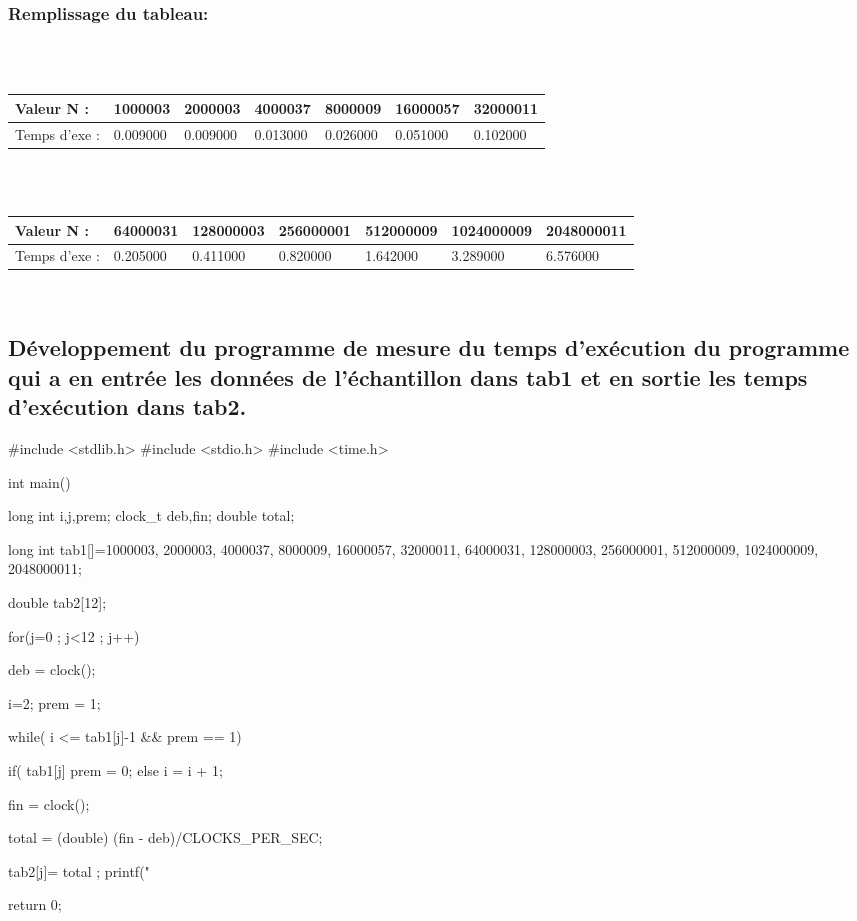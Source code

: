 \documentclass[12pt]{article}
\begin{document}
\subsubsection{Remplissage du tableau:}
\color{blue}
\textrm{  }
\\
\\
\begin{tabular}{|p{3cm}||p{1.8cm}|p{1.8cm}|p{1.8cm}|p{1.8cm}|p{1.8cm}|p{1.8cm}|}
\hline
Valeur N : & 1000003 & 2000003 & 4000037 & 8000009 & 16000057  & 32000011\\
\hline
Temps d'exe : & 0.009000 & 0.009000 & 0.013000 & 0.026000 & 0.051000 & 0.102000 \\
\hline
\end{tabular}
\\
\\
\begin{tabular}{|p{3cm}||p{1.8cm}|p{1.8cm}|p{1.8cm}|p{1.8cm}|p{1.8cm}|p{1.8cm}|}
\hline
Valeur N : & 64000031 & 128000003 & 256000001 & 512000009 &  1024000009 & 2048000011\\
\hline
Temps d'exe : &  0.205000 & 0.411000 & 0.820000 & 1.642000 & 3.289000 & 6.576000 \\
\hline
\end{tabular}


\textrm{  }
\\
\color{black}



\subsection{Développement du programme de mesure du temps d'exécution du programme qui a en entrée les données de l'échantillon dans tab1 et en sortie les temps d'exécution dans tab2. }
\begin{sql}
#include <stdlib.h>
#include <stdio.h>
#include <time.h>

int main()
{
	long int i,j,prem;
	clock_t deb,fin;
	double total;

	long int tab1[]={1000003, 2000003,	4000037,	8000009,	16000057,	32000011,	64000031,
	128000003,	256000001,	512000009,	1024000009,	2048000011};

	double tab2[12];

for(j=0 ; j<12 ; j++)
{
	deb = clock();
	
	i=2;
	prem = 1;

	while( i <= tab1[j]-1 && prem == 1){

		if( tab1[j]%
			prem = 0;
		else
			i = i + 1;
	}
	fin = clock();

	total = (double) (fin - deb)/CLOCKS_PER_SEC;
	
	tab2[j]= total ;
	printf("%
}
return 0;

}

\end{sql}
\end{document}
